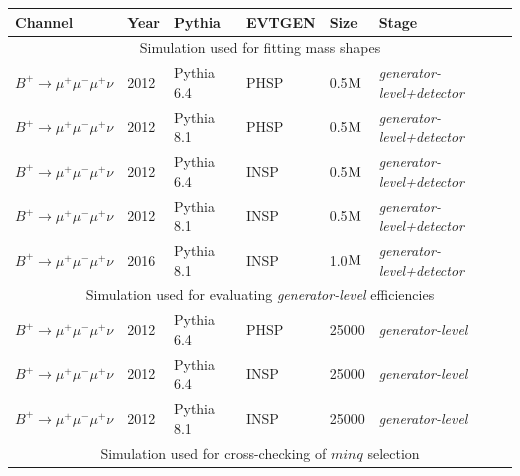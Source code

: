 \begin{table}[h!]
	\begin{center}
		\begin{tabular}{l l l l l l}
                       \toprule
			Channel & Year & Pythia  & EVTGEN & Size & Stage \\ \hline
			 \multicolumn{6}{c}{Simulation used for fitting mass shapes} \\ \hline
			$B^{+} \rightarrow \mu^{+} \mu^{-} \mu^{+} \nu$ & 2012 & Pythia 6.4\cite{pythia6} & PHSP & 0.5$\rm{M}$ & \textit{generator-level+detector}\\
			$B^{+} \rightarrow \mu^{+} \mu^{-} \mu^{+} \nu$ & 2012 & Pythia 8.1\cite{pythia8} & PHSP & 0.5$\rm{M}$ & \textit{generator-level+detector}\\
			$B^{+} \rightarrow \mu^{+} \mu^{-} \mu^{+} \nu$ & 2012 & Pythia 6.4\cite{pythia6} & INSP & 0.5$\rm{M}$ & \textit{generator-level+detector}\\
			$B^{+} \rightarrow \mu^{+} \mu^{-} \mu^{+} \nu$ & 2012 & Pythia 8.1\cite{pythia8} & INSP & 0.5$\rm{M}$ & \textit{generator-level+detector}\\
			$B^{+} \rightarrow \mu^{+} \mu^{-} \mu^{+} \nu$ & 2016 & Pythia 8.1\cite{pythia8} & INSP & 1.0$\rm{M}$ & \textit{generator-level+detector}\\ \hline
			 \multicolumn{6}{c}{Simulation used for evaluating \textit{generator-level} efficiencies} \\ \hline
			$B^{+} \rightarrow \mu^{+} \mu^{-} \mu^{+} \nu$ & 2012 & Pythia 6.4\cite{pythia6} & PHSP & 25000 & \textit{generator-level}\\ %
			$B^{+} \rightarrow \mu^{+} \mu^{-} \mu^{+} \nu$ & 2012 & Pythia 6.4\cite{pythia6} & INSP & 25000 & \textit{generator-level}\\
			$B^{+} \rightarrow \mu^{+} \mu^{-} \mu^{+} \nu$ & 2012 & Pythia 8.1\cite{pythia8} & INSP & 25000 & \textit{generator-level}\\ \hline

                         \multicolumn{6}{c}{Simulation used for cross-checking of $minq$ selection} \\ \hline 


\end{tabular}
\end{center}
\end{table}
